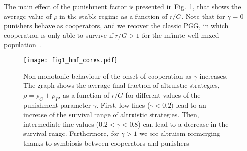 \documentclass[5p]{elsarticle}
\begin{document}
The main effect of the punishment factor is presented in Fig.~\ref{fig-varR}, that shows the average value of $\rho$ in the stable regime as a function of $r/G$. Note that for $\gamma=0$ punishers behave as cooperators, and we recover the classic PGG, in which cooperation is only able to survive if $r/G>1$ for the infinite well-mixed  population~\cite{szolnoki_pre11c}. 
%

\begin{figure}[t]
\begin{center}
\texttt{[image: fig1\_hmf\_cores.pdf]}
\caption{Non-monotonic behaviour of the onset of cooperation as $\gamma$ increases. The graph shows the average final fraction of altruistic strategies, $\rho=\rho_C+\rho_P$, as a function of $r/G$ for different values of the punishment parameter $\gamma$. First, low fines ($\gamma<0.2)$ lead to an increase of the survival range of altruistic strategies. Then, intermediate fine values  ($0.2 < \gamma < 0.8$) can lead to a decrease in the survival range. Furthermore, for $\gamma>1$ we see altruism reemerging thanks to symbiosis between cooperators and punishers.}
\label{fig-varR}
\end{center}
\end{figure}
\end{document}
